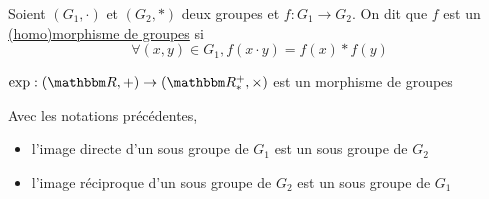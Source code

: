\begin{defn}
	Soient $(G_1, \cdot)$ et $(G_2, *)$ deux groupes et $f: G_1 \to G_2$. On dit que $f$ est un \underline{(homo)morphisme de groupes} si \[
	\forall (x,y) \in G_1, f(x\cdot y) = f(x) * f(y)
	\] 
\end{defn}

\begin{exm}
	$\exp: (\R, +) \to (\R_*^+, \times)$ est un morphisme de groupes
\end{exm}

\begin{prop}
	Avec les notations précédentes,
	\begin{itemize}
		\item l'image directe d'un sous groupe de $G_1$ est un sous groupe de $G_2$
		\item l'image réciproque d'un sous groupe de $G_2$ est un sous groupe de $G_1$
	\end{itemize}
\end{prop}

